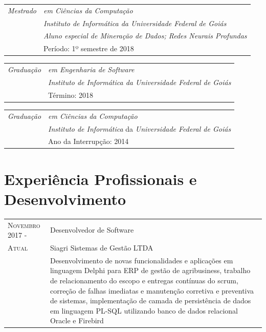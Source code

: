 \documentclass[12pt, oneside, openany, a4paper, english, brazil]{abntex2}
\begin{document}
\begin{tabular}{p{2.2cm}|p{12cm}}
    \emph{Mestrado}
    & \emph{em Ciências da Computação} \\
    & \emph{Instituto de Informática da Universidade Federal de Goiás} \\
    & \emph{Aluno especial de Mineração de Dados; Redes Neurais Profundas} \\
    & Período: 1º semestre de 2018 \\
\end{tabular}

\begin{tabular}{p{2.2cm}|p{12cm}}
    \emph{Graduação}
    & \emph{em Engenharia de Software} \\
    & \emph{Instituto de Informática da Universidade Federal de Goiás} \\
    & Término: 2018\\
\end{tabular}

\begin{tabular}{p{2.2cm}|p{12cm}}
    \emph{Graduação}
    & \emph{em Ciências da Computação}\\
    & \emph{Instituto de Informática} da \emph{Universidade Federal de Goiás} \\
    & Ano da Interrupção: 2014\\
\end{tabular}


\section{Experiência Profissionais e Desenvolvimento}

\begin{tabular}{p{3.5cm}p{11cm}}
    \textsc{Novembro 2017} - & Desenvolvedor de Software \\
    \textsc{Atual} & Siagri Sistemas de Gestão LTDA \\
    \textsc{} & Desenvolvimento de novas funcionalidades e aplicações em linguagem Delphi para ERP de gestão de agribusiness, trabalho de relacionamento do escopo e entregas contínuas do scrum, correção de falhas imediatas e manutenção corretiva e preventiva de sistemas, implementação de camada de persistência de dados em linguagem PL-SQL utilizando banco de dados relacional Oracle e Firebird
\end{tabular}
\end{document}
